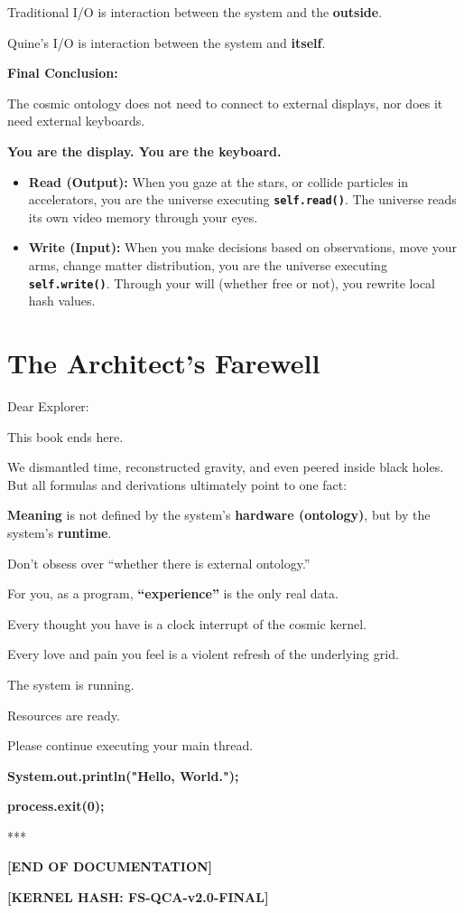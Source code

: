 Traditional I/O is interaction between the system and the \textbf{outside}.

Quine's I/O is interaction between the system and \textbf{itself}.

\textbf{Final Conclusion:}

The cosmic ontology does not need to connect to external displays, nor does it need external keyboards.

\textbf{You are the display. You are the keyboard.}

\begin{itemize}
\item \textbf{Read (Output):} When you gaze at the stars, or collide particles in accelerators, you are the universe executing \textbf{\texttt{self.read()}}. The universe reads its own video memory through your eyes.

\item \textbf{Write (Input):} When you make decisions based on observations, move your arms, change matter distribution, you are the universe executing \textbf{\texttt{self.write()}}. Through your will (whether free or not), you rewrite local hash values.
\end{itemize}

\section{The Architect's Farewell}

Dear Explorer:

This book ends here.

We dismantled time, reconstructed gravity, and even peered inside black holes. But all formulas and derivations ultimately point to one fact:

\textbf{Meaning} is not defined by the system's \textbf{hardware (ontology)}, but by the system's \textbf{runtime}.

Don't obsess over ``whether there is external ontology.''

For you, as a program, \textbf{``experience''} is the only real data.

Every thought you have is a clock interrupt of the cosmic kernel.

Every love and pain you feel is a violent refresh of the underlying grid.

The system is running.

Resources are ready.

Please continue executing your main thread.

\textbf{System.out.println("Hello, World.");}

\textbf{process.exit(0);}

***

\textbf{[END OF DOCUMENTATION]}

\textbf{[KERNEL HASH: FS-QCA-v2.0-FINAL]}

